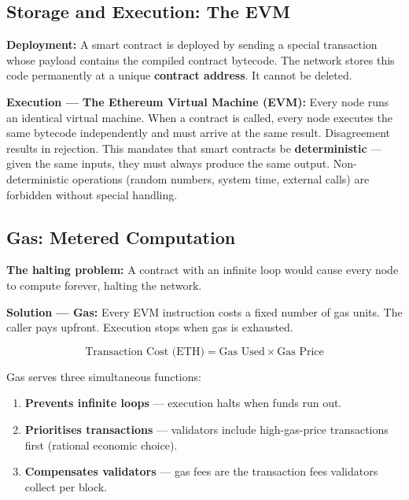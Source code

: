 \documentclass[12pt, a4paper]{article}
\begin{document}
\subsection{Storage and Execution: The EVM}

\textbf{Deployment:} A smart contract is deployed by sending a special transaction
whose payload contains the compiled contract bytecode. The network stores this code
permanently at a unique \textbf{contract address}. It cannot be deleted.

\textbf{Execution --- The Ethereum Virtual Machine (EVM):} Every node runs an
identical virtual machine. When a contract is called, every node executes the same
bytecode independently and must arrive at the same result. Disagreement results in
rejection. This mandates that smart contracts be \textbf{deterministic} --- given
the same inputs, they must always produce the same output. Non-deterministic
operations (random numbers, system time, external calls) are forbidden without
special handling.

\subsection{Gas: Metered Computation}

\textbf{The halting problem:} A contract with an infinite loop would cause every
node to compute forever, halting the network.

\textbf{Solution --- Gas:} Every EVM instruction costs a fixed number of gas units.
The caller pays upfront. Execution stops when gas is exhausted.

\[
    \text{Transaction Cost (ETH)} = \text{Gas Used} \times \text{Gas Price}
\]

Gas serves three simultaneous functions:
\begin{enumerate}
    \item \textbf{Prevents infinite loops} --- execution halts when funds run out.
    \item \textbf{Prioritises transactions} --- validators include high-gas-price
          transactions first (rational economic choice).
    \item \textbf{Compensates validators} --- gas fees are the transaction fees
          validators collect per block.
\end{enumerate}

\end{document}
